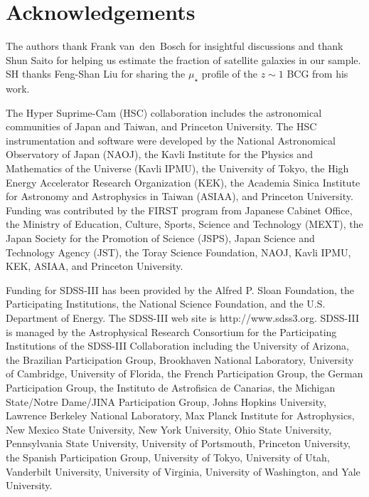 \documentclass[a4paper,fleqn,usenatbib]{mnras}
\def\mden{{$\mu_{\star}$}}
\begin{document}
  
\section*{Acknowledgements}

  The authors thank Frank van~den~Bosch for insightful discussions and thank 
  Shun Saito for helping us estimate the fraction of satellite galaxies in our sample.
  SH thanks Feng-Shan Liu for sharing the \mden{} profile of the $z\sim1$ BCG from 
  his work.

  The Hyper Suprime-Cam (HSC) collaboration includes the astronomical communities of 
  Japan and Taiwan, and Princeton University.  The HSC instrumentation and software were
  developed by the National Astronomical Observatory of Japan (NAOJ), the Kavli Institute
  for the Physics and Mathematics of the Universe (Kavli IPMU), the University of Tokyo,
  the High Energy Accelerator Research Organization (KEK), the Academia Sinica Institute
  for Astronomy and Astrophysics in Taiwan (ASIAA), and Princeton University.  
  Funding was contributed by the FIRST program from Japanese Cabinet Office, the Ministry 
  of Education, Culture, Sports, Science and Technology (MEXT), the Japan Society for 
  the Promotion of Science (JSPS), Japan Science and Technology Agency (JST), the
  Toray Science Foundation, NAOJ, Kavli IPMU, KEK, ASIAA, and Princeton University.
   
  Funding for SDSS-III has been provided by the Alfred P. Sloan Foundation, the
  Participating Institutions, the National Science Foundation, and the U.S.  Department of
  Energy. The SDSS-III web site is http://www.sdss3.org.  SDSS-III is managed by the
  Astrophysical Research Consortium for the Participating Institutions of the SDSS-III
  Collaboration including the University of Arizona, the Brazilian Participation Group,
  Brookhaven National Laboratory, University of Cambridge, University of Florida, the
  French Participation Group, the German Participation Group, the Instituto de Astrofisica
  de Canarias, the Michigan State/Notre Dame/JINA Participation Group, Johns Hopkins
  University, Lawrence Berkeley National Laboratory, Max Planck Institute for
  Astrophysics, New Mexico State University, New York University, Ohio State University,
  Pennsylvania State University, University of Portsmouth, Princeton University, the
  Spanish Participation Group, University of Tokyo, University of Utah, Vanderbilt
  University, University of Virginia, University of Washington, and Yale University.
  
\end{document}
